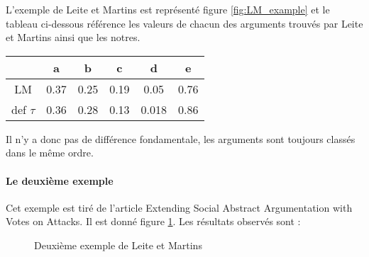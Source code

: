 \documentclass[12pt]{article}
\theoremstyle{defi}
\theoremstyle{not}
\theoremstyle{prob}
\begin{document}
          L'exemple de Leite et Martins est représenté figure \ref{fig:LM_example} et le tableau ci-dessous référence les valeurs de chacun des arguments trouvés par Leite et Martins ainsi que les notres.

          \begin{tabular}{|c|c|c|c|c|c|}
            \hline
                       & a    & b    & c    & d     & e \\
            \hline
            LM         & 0.37 & 0.25 & 0.19 & 0.05  & 0.76 \\
            \hline
            def $\tau$ & 0.36 & 0.28 & 0.13 & 0.018 & 0.86\\
            \hline
          \end{tabular}

          Il n'y a donc pas de différence fondamentale, les arguments sont toujours classés dans le même ordre.

        \paragraph{Le deuxième exemple\\}
          Cet exemple est tiré de l'article Extending Social Abstract Argumentation with Votes on Attacks.
          Il est donné figure \ref{fig:LM2_example}. Les résultats observés sont :

          \begin{figure}
            \centering
            \caption{Deuxième exemple de Leite et Martins}
            \label{fig:LM2_example}
          \end{figure}
\end{document}
